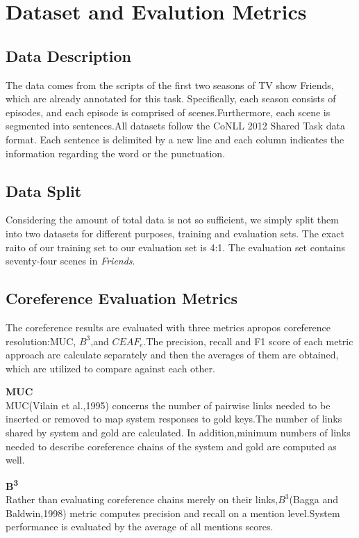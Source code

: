 \documentclass[11pt]{article}
\begin{document}
\section{Dataset and Evalution Metrics}
\subsection{Data Description}
The data comes from the scripts of the first two seasons of TV show Friends, which are already annotated for this task. Specifically, each season consists of episodes, and each episode is comprised of scenes.Furthermore, each scene is segmented into sentences.All datasets follow the CoNLL 2012 Shared Task data format. Each sentence is delimited by a new line and each column indicates the information regarding the word or the punctuation.
\subsection{Data Split}
Considering the amount of total data is not so sufficient, we simply split them into two datasets for different purposes, training and evaluation sets. The exact raito of our training set to our evaluation set is 4:1. The evaluation set contains seventy-four scenes in \textit{Friends}.

\subsection{Coreference Evaluation Metrics}
The coreference results are evaluated with three metrics apropos coreference resolution:MUC, $B^{3}$,and $CEAF_e$.The precision, recall and F1 score of each metric approach are calculate separately and then the averages of them are obtained, which are utilized to compare against each other.

\textbf{MUC}\\
MUC(Vilain et al.,1995) concerns the number of pairwise links needed to be inserted or removed to map system responses to gold keys.The number of links shared by  system and gold are calculated. In addition,minimum numbers of links needed to describe coreference chains of the system and gold are computed as well.

\textbf{B\textsuperscript{3}} \\
Rather than evaluating coreference chains merely on their links,$B^{3}$(Bagga and Baldwin,1998) metric computes precision and recall on a mention level.System performance is evaluated by the average of all mentions scores.
\end{document}
